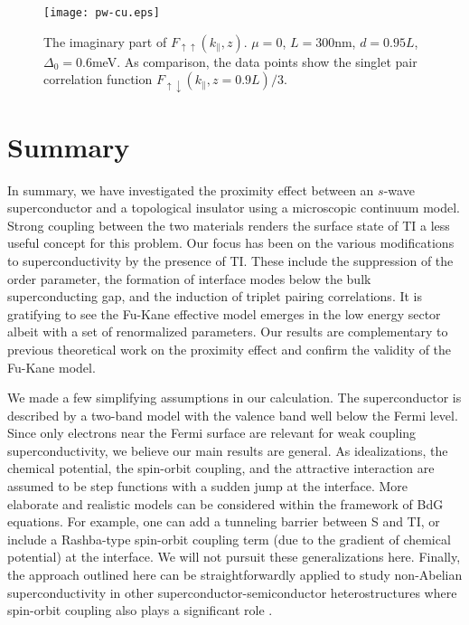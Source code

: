 \documentclass[11pt,revtex,aps]{report}
\begin{document}
\begin{figure}
\center
\texttt{[image: pw-cu.eps]}
\caption{The imaginary part of 
$F_{\uparrow\uparrow}(k_\parallel,z)$. $\mu=0$, $L=300$nm, $d=0.95L$, $\Delta_0=0.6$meV.
As comparison, the data points show the singlet pair correlation function 
$F_{\uparrow\downarrow}(k_\parallel,z=0.9L)/3$.
}\label{pw-cu}
\end{figure}

\section{Summary}
In summary, we have investigated the proximity effect between an $s$-wave superconductor
and a topological insulator using a microscopic continuum model. 
Strong coupling between the two materials renders the surface state of TI a less 
useful concept for this problem.
Our focus has been on the various modifications to superconductivity by the presence of TI. 
These include the suppression of the order parameter, the formation of interface modes
below the bulk superconducting gap, and the induction of triplet pairing correlations.
It is gratifying to see the Fu-Kane effective model emerges in the low energy sector
albeit with a set of renormalized parameters. Our results are complementary to
previous theoretical work on the proximity effect \cite{f-k,stan} and confirm the validity
of the Fu-Kane model.

We made a few simplifying assumptions in our calculation. The superconductor is described 
by a two-band model with the valence band well below the Fermi level. Since only 
electrons near the Fermi surface are relevant for weak coupling superconductivity, we 
believe our main results are general. As idealizations, the chemical 
potential, the spin-orbit coupling, and the attractive interaction are assumed to be 
step functions with a sudden jump at the interface. 
More elaborate and realistic models can be considered within the framework of BdG equations.
For example, one can add a tunneling barrier between S and TI, 
or include a Rashba-type spin-orbit coupling term 
(due to the gradient of chemical potential) at the interface. We will not 
pursuit these generalizations here.
Finally, the approach outlined here can be straightforwardly applied to 
study non-Abelian superconductivity in other superconductor-semiconductor
heterostructures where spin-orbit coupling also plays a significant role
\cite{roman,maryland,jason,mao1,mao2}.
\end{document}
